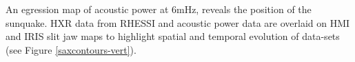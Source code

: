 An egression map of acoustic power at 6mHz, reveals the position of the sunquake. HXR data from RHESSI and acoustic power data are overlaid on HMI and IRIS slit jaw maps to highlight spatial and temporal evolution of data-sets (see Figure \ref{saxcontours-vert}).\\
%
%
%

